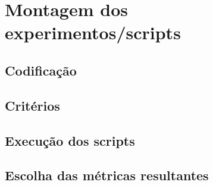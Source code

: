 \section{Montagem dos experimentos/scripts}
\subsection{Codificação}
\subsection{Critérios}
\subsection{Execução dos scripts}
\subsection{Escolha das métricas resultantes}
